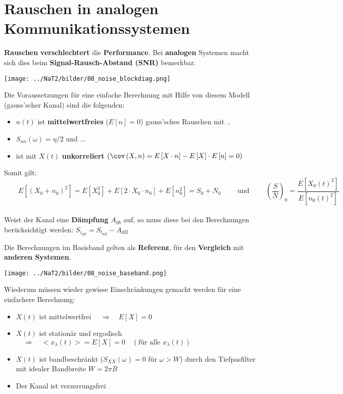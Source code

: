 \section{Rauschen in analogen Kommunikationssystemen }
\textbf{Rauschen} \textbf{verschlechtert} die \textbf{Performance}. Bei \textbf{analogen} Systemen
macht sich dies beim \textbf{Signal-Rausch-Abstand (SNR)} bemerkbar.
\begin{center}
	\texttt{[image: ../NaT2/bilder/08\_noise\_blockdiag.png]}
\end{center}
Die Voraussetzungen für eine einfache Berechnung mit Hilfe von diesem Modell (gauss'scher Kanal)
sind die folgenden:
\begin{itemize}
  \item $n(t)$ ist \textbf{mittelwertfreies} ($E[n] = 0$) gauss'sches Rauschen mit ..
  \item $S_{nn}(\omega) = \eta/2$ und $\ldots$
  \item ist mit $X \left( t \right)$ \textbf{unkorreliert} $\left( \cov
  \left(X,n \right) = E \left[ X \cdot n \right] - E \left[ X \right] \cdot E
  \left[ n \right] = 0 \right)$
\end{itemize}
Somit gilt: $\qquad E[(X_0 + n_0)^2] = E[X_0^2] + E[2 \cdot X_0 \cdot n_0] + E[n_0^2] = S_0 + N_0
\qquad \text{ und } \qquad \left(\dfrac{S}{N}\right)_0 = \dfrac{E[X_0(t)^2]}{E[n_0(t)^2]}$ \\ \\
Weist der Kanal eine \textbf{Dämpfung} $A_{db}$ auf, so muss diese bei den Berechnungen berücksichtigt
werden: $S_{i_{dB}} = S_{t_{dB}} - A_{dB}$



Die Berechnungen im Basisband gelten als \textbf{Referenz}, für den \textbf{Vergleich} mit
\textbf{anderen Systemen}. \\
\begin{center}
	\texttt{[image: ../NaT2/bilder/08\_noise\_baseband.png]}
\end{center}
Wiederum müssen wieder gewisse Einschränkungen gemacht werden für eine einfachere Berechnung:
\begin{itemize}
  \item $X(t)$ ist mittelwertfrei $\quad \Rightarrow \quad E[X]=0$
  \item $X(t)$ ist stationär und ergodisch $\quad \Rightarrow \quad <x_{\lambda}(t)> = E[X] = 0
  \quad (\text{für alle } x_{\lambda}(t))$
  \item $X(t)$ ist bandbeschränkt ($S_{XX}(\omega) = 0 $ für $\omega > W$) durch den Tiefpasfilter
  mit idealer Bandbreite $W = 2 \pi B$
  \item Der Kanal ist verzerrungsfrei
\end{itemize}

